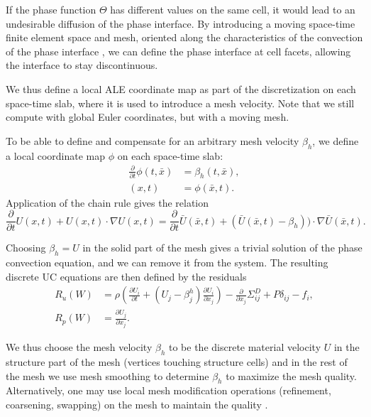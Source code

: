 If the phase function $\Theta$ has different values on the same cell,
it would lead to an undesirable diffusion of the phase interface. By
introducing a moving space-time finite element space and mesh,
oriented along the characteristics of the convection of the phase
interface \citep[section concerning ``The characteristic Galerkin
  method'']{ErikssonEstepHansboEtAl1996}, we can define the phase
interface at cell facets, allowing the interface to stay
discontinuous.

We thus define a local ALE coordinate map as part of the
discretization on each space-time slab, where it is used to introduce
a mesh velocity. Note that we still compute with global Euler
coordinates, but with a moving mesh.

To be able to define and compensate for an arbitrary mesh velocity
$\beta_h$, we define a local coordinate map $\phi$ on each space-time
slab:
\begin{equation}
  \begin{split}\label{eq:ALEmap}
    \frac{\partial}{\partial t} \phi(t, \bar{x}) &= \beta_h(t, \bar{x}),
    \\
    (x, t) &= \phi(\bar{x}, t).
  \end{split}
\end{equation}
Application of the chain rule gives the relation
\begin{equation}
  \label{eq:ALE2}
  \frac{\partial}{\partial t} U(x,t) + U(x,t) \cdot \nabla U(x,t) = \frac{\partial}{\partial t} \bar{U}(\bar{x},t) +
  (\bar{U}(\bar{x},t) - \beta_h)) \cdot \nabla \bar{U}(\bar{x},t).
\end{equation}

Choosing $\beta_h = U$ in the solid part of the mesh gives a trivial
solution of the phase convection equation, and we can remove it from
the system. The resulting discrete UC equations are then defined by the residuals
\begin{equation}
  \begin{split}\label{eq:ALE}
    R_u(W) &= \rho\left(\frac{\partial U_i}{\partial t} + (U_j - \beta^h_j) \frac{\partial U_i}{\partial x_j} \right) - \frac{\partial}{\partial x_j} \Sigma^D_{ij} + P \delta_{ij} - f_i,
    \\
    R_p(W) &= \frac{\partial U_j}{\partial x_j}.
  \end{split}
\end{equation}

We thus choose the mesh velocity $\beta_h$ to be the discrete material
velocity $U$ in the structure part of the mesh (vertices touching
structure cells) and in the rest of the mesh we use mesh smoothing to
determine $\beta_h$ to maximize the mesh quality. Alternatively, one
may use local mesh modification operations (refinement, coarsening,
swapping) on the mesh to maintain the quality
\citep{Comp`ereRemacleJanssonEtAl2009}.

